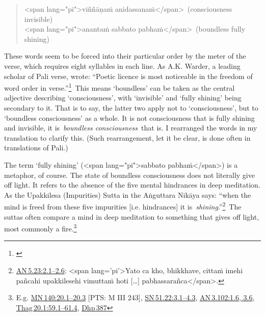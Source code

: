 \documentclass[10pt, openright]{book}
\begin{document}
\begin{quote}


\begin{itemize}

<span lang="pi">viññāṇaṁ anidassanaṁ</span> (consciousness invisible) \\ <span lang="pi">anantaṁ sabbato pabhaṁ</span> (boundless fully shining)

\end{itemize}

\end{quote}
These words seem to be forced into their particular order by the meter of the verse, which requires eight syllables in each line. As A.K. Warder, a leading scholar of Pali verse, wrote: “Poetic licence is most noticeable in the freedom of word order in verse.”\footnote {\cite{Warder}} This means ‘boundless’ can be taken as the central adjective describing ‘consciousness’, with ‘invisible’ and ‘fully shining’ being secondary to it. That is to say, the latter two apply not to ‘consciousness’, but to ‘boundless consciousness’ as a whole. It is not consciousness that is fully shining and invisible, it is \textit{boundless consciousness} that is. I rearranged the words in my translation to clarify this. (Such rearrangement, let it be clear, is done often in translations of Pali.)


The term ‘fully shining’ (<span lang="pi">sabbato pabhaṁ</span>) is a metaphor, of course. The state of boundless consciousness does not literally give off light. It refers to the absence of the five mental hindrances in deep meditation. As the Upakkilesa (Impurities) Sutta in the Aṅguttara Nikāya says: “when the mind is freed from these five impurities [i.e. hindrances] it is \textit{shining}.”\footnote {\href{https://suttacentral.net/an5.23/en/sujato\#2.1}{AN 5.23:2.1–2.6}: <span lang='pi'>Yato ca kho, bhikkhave, cittaṁ imehi pañcahi upakkilesehi vimuttaṁ hoti […] pabhassarañca</span>.} The suttas often compare a mind in deep meditation to something that gives off light, most commonly a fire.\footnote {E.g. \href{https://suttacentral.net/mn140/en/sujato\#20.1}{MN 140:20.1–20.3} [PTS: M III 243], \href{https://suttacentral.net/sn51.22/en/sujato\#3.1}{SN 51.22:3.1–4.3}, \href{https://suttacentral.net/an3.102/en/sujato\#1.6}{AN 3.102:1.6, 3.6}, \href{https://suttacentral.net/thag20.1/en/sujato\#59.1}{Thag 20.1:59.1–61.4}, \href{https://suttacentral.net/dhp387/en/sujato}{Dhp 387}}
\end{document}
